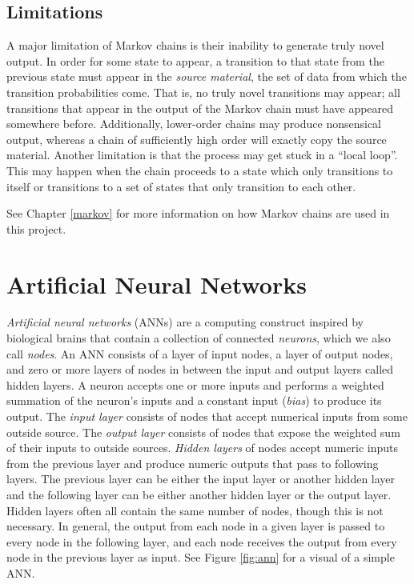 \subsection{Limitations} \label{bg:markov:limitations}

A major limitation of Markov chains is their inability to generate truly novel output.
In order for some state to appear, a transition to that state from the previous state must appear in the \textit{source material}, the set of data from which the transition probabilities come.
That is, no truly novel transitions may appear; all transitions that appear in the output of the Markov chain must have appeared somewhere before.
Additionally, lower-order chains may produce nonsensical output, whereas a chain of sufficiently high order will exactly copy the source material.
Another limitation is that the process may get stuck in a ``local loop''.
This may happen when the chain proceeds to a state which only transitions to itself or transitions to a set of states that only transition to each other.

See Chapter \ref{markov} for more information on how Markov chains are used in this project.

\section{Artificial Neural Networks} \label{bg:nn}

\textit{Artificial neural networks} (ANNs) are a computing construct inspired by biological brains that contain a collection of connected \textit{neurons}, which we also call \textit{nodes}.
An ANN consists of a layer of input nodes, a layer of output nodes, and zero or more layers of nodes in between the input and output layers called hidden layers.
A neuron accepts one or more inputs and performs a weighted summation of the neuron's inputs and a constant input (\textit{bias}) to produce its output.
The \textit{input layer} consists of nodes that accept numerical inputs from some outside source.
The \textit{output layer} consists of nodes that expose the weighted sum of their inputs to outside sources.
\textit{Hidden layers} of nodes accept numeric inputs from the previous layer and produce numeric outputs that pass to following layers.
The previous layer can be either the input layer or another hidden layer and the following layer can be either another hidden layer or the output layer.
Hidden layers often all contain the same number of nodes, though this is not necessary.
In general, the output from each node in a given layer is passed to every node in the following layer, and each node receives the output from every node in the previous layer as input.
See Figure \ref{fig:ann} for a visual of a simple ANN.

